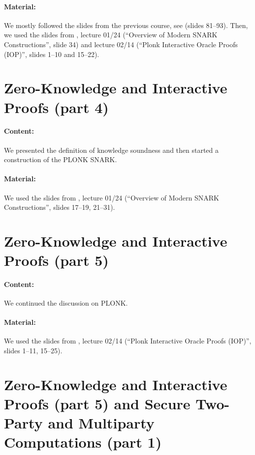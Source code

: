 \documentclass{llncs}
\begin{document}
\paragraph{Material:} We mostly followed the slides from the previous course, see \cite{ZK}  (slides 81--93). Then, we used the slides from \cite{ZKlearning}, lecture 01/24 (``Overview of Modern SNARK Constructions'', slide 34) and lecture 02/14 (``Plonk Interactive Oracle Proofs (IOP)'', slides 1--10 and 15--22).




\section{Zero-Knowledge and Interactive Proofs (part 4)}

\paragraph{Content:}
We presented the definition of knowledge soundness and then started a construction of the PLONK SNARK.




\paragraph{Material:} We used the slides from \cite{ZKlearning}, lecture 01/24 (``Overview of Modern SNARK Constructions'', slides 17--19, 21--31).



\section{Zero-Knowledge and Interactive Proofs (part 5)}

\paragraph{Content:}  We continued the discussion on PLONK.

\paragraph{Material:} We used the slides from \cite{ZKlearning}, lecture 02/14 (``Plonk Interactive Oracle Proofs (IOP)'', slides 1--11, 15--25).


\section{Zero-Knowledge and Interactive Proofs (part 5) and Secure Two-Party and Multiparty Computations (part 1)}
\end{document}
